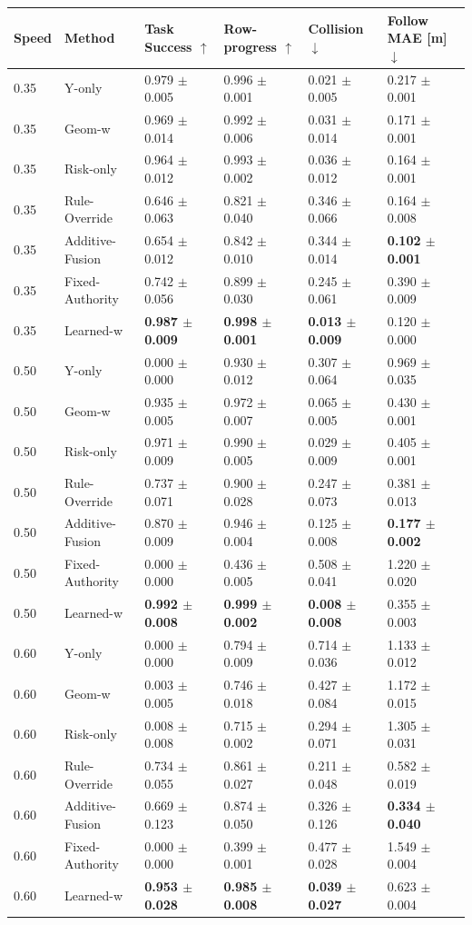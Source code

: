 \begin{tabular}{llllll}
\toprule
Speed & Method & Task Success $\uparrow$ & Row-progress $\uparrow$ & Collision $\downarrow$ & Follow MAE [m] $\downarrow$ \\
\midrule
0.35 & Y-only & 0.979 $\pm$ 0.005 & 0.996 $\pm$ 0.001 & 0.021 $\pm$ 0.005 & 0.217 $\pm$ 0.001 \\
0.35 & Geom-w & 0.969 $\pm$ 0.014 & 0.992 $\pm$ 0.006 & 0.031 $\pm$ 0.014 & 0.171 $\pm$ 0.001 \\
0.35 & Risk-only & 0.964 $\pm$ 0.012 & 0.993 $\pm$ 0.002 & 0.036 $\pm$ 0.012 & 0.164 $\pm$ 0.001 \\
0.35 & Rule-Override & 0.646 $\pm$ 0.063 & 0.821 $\pm$ 0.040 & 0.346 $\pm$ 0.066 & 0.164 $\pm$ 0.008 \\
0.35 & Additive-Fusion & 0.654 $\pm$ 0.012 & 0.842 $\pm$ 0.010 & 0.344 $\pm$ 0.014 & \textbf{0.102 $\pm$ 0.001} \\
0.35 & Fixed-Authority & 0.742 $\pm$ 0.056 & 0.899 $\pm$ 0.030 & 0.245 $\pm$ 0.061 & 0.390 $\pm$ 0.009 \\
0.35 & Learned-w & \textbf{0.987 $\pm$ 0.009} & \textbf{0.998 $\pm$ 0.001} & \textbf{0.013 $\pm$ 0.009} & 0.120 $\pm$ 0.000 \\
0.50 & Y-only & 0.000 $\pm$ 0.000 & 0.930 $\pm$ 0.012 & 0.307 $\pm$ 0.064 & 0.969 $\pm$ 0.035 \\
0.50 & Geom-w & 0.935 $\pm$ 0.005 & 0.972 $\pm$ 0.007 & 0.065 $\pm$ 0.005 & 0.430 $\pm$ 0.001 \\
0.50 & Risk-only & 0.971 $\pm$ 0.009 & 0.990 $\pm$ 0.005 & 0.029 $\pm$ 0.009 & 0.405 $\pm$ 0.001 \\
0.50 & Rule-Override & 0.737 $\pm$ 0.071 & 0.900 $\pm$ 0.028 & 0.247 $\pm$ 0.073 & 0.381 $\pm$ 0.013 \\
0.50 & Additive-Fusion & 0.870 $\pm$ 0.009 & 0.946 $\pm$ 0.004 & 0.125 $\pm$ 0.008 & \textbf{0.177 $\pm$ 0.002} \\
0.50 & Fixed-Authority & 0.000 $\pm$ 0.000 & 0.436 $\pm$ 0.005 & 0.508 $\pm$ 0.041 & 1.220 $\pm$ 0.020 \\
0.50 & Learned-w & \textbf{0.992 $\pm$ 0.008} & \textbf{0.999 $\pm$ 0.002} & \textbf{0.008 $\pm$ 0.008} & 0.355 $\pm$ 0.003 \\
0.60 & Y-only & 0.000 $\pm$ 0.000 & 0.794 $\pm$ 0.009 & 0.714 $\pm$ 0.036 & 1.133 $\pm$ 0.012 \\
0.60 & Geom-w & 0.003 $\pm$ 0.005 & 0.746 $\pm$ 0.018 & 0.427 $\pm$ 0.084 & 1.172 $\pm$ 0.015 \\
0.60 & Risk-only & 0.008 $\pm$ 0.008 & 0.715 $\pm$ 0.002 & 0.294 $\pm$ 0.071 & 1.305 $\pm$ 0.031 \\
0.60 & Rule-Override & 0.734 $\pm$ 0.055 & 0.861 $\pm$ 0.027 & 0.211 $\pm$ 0.048 & 0.582 $\pm$ 0.019 \\
0.60 & Additive-Fusion & 0.669 $\pm$ 0.123 & 0.874 $\pm$ 0.050 & 0.326 $\pm$ 0.126 & \textbf{0.334 $\pm$ 0.040} \\
0.60 & Fixed-Authority & 0.000 $\pm$ 0.000 & 0.399 $\pm$ 0.001 & 0.477 $\pm$ 0.028 & 1.549 $\pm$ 0.004 \\
0.60 & Learned-w & \textbf{0.953 $\pm$ 0.028} & \textbf{0.985 $\pm$ 0.008} & \textbf{0.039 $\pm$ 0.027} & 0.623 $\pm$ 0.004 \\
\bottomrule
\end{tabular}
